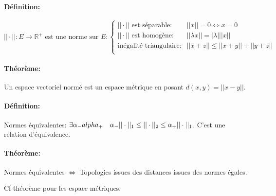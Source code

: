 \documentclass[a4paper, 11pt, french]{book}
\theoremstyle{plain} %
\theoremstyle{definition} %
\theoremstyle{remark} %
\newcommand{\1}{\mathds{1}}
\begin{document}
\paragraph{Définition:}
$
	\text{$|| \cdot||:E\rightarrow\mathbb{R}^+$ est une norme sur $E$}:
	\left\{
	\begin{array}{ll}
		\text{$|| \cdot||$ est séparable:} & ||x||=0\iff x=0                 \\
		\text{$|| \cdot||$ est homogène:}  & || \lambda x||=| \lambda| ||x|| \\
		\text{inégalité triangulaire:}     & ||x+z|| \le ||x+y||+||y+z||     \\
	\end{array}
	\right.
$

\paragraph{Théorème:} Un espace vectoriel normé est un espace métrique en posant $d(x, y)=||x-y||$.

\paragraph{Définition:} Normes équivalentes: $\exists\alpha_-\\alpha_+\quad\alpha_- || \cdot||_1\le || \cdot||_2\le\alpha_+ || \cdot||_1 $. C'est une relation d'équivalence.

\paragraph{Théorème:} Normes équivalentes $\iff$ Topologies issues des distances issues des normes égales.

\fbox{$\implies$} Cf théorème pour les espace métriques.
\end{document}
